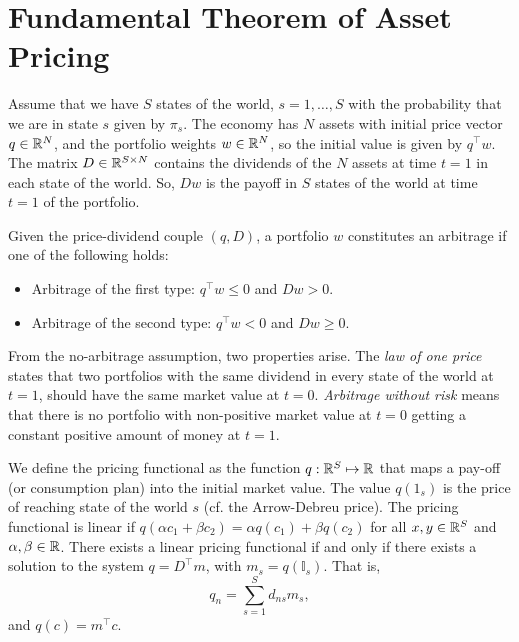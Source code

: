 \documentclass[twoside, titlepage]{article}
\begin{document}

\section{Fundamental Theorem of Asset Pricing}

Assume that we have $S$ states of the world, $s = 1, \dots, S$ with the probability that we are in state $s$ given by $\pi_s$. The economy has $N$ assets with initial price vector $q \in \mathbb{R}^N$, and the portfolio weights $w \in \mathbb{R}^N$, so the initial value is given by $q^\top w$. The matrix $D \in \mathbb{R}^{S \times N}$ contains the dividends of the $N$ assets at time $t=1$ in each state of the world. So, $Dw$ is the payoff in $S$ states of the world at time $t=1$ of the portfolio.

Given the price-dividend couple $(q, D)$, a portfolio $w$ constitutes an arbitrage if one of the following holds:
\begin{itemize}
    \item Arbitrage of the first type: $q^\top w \leq 0$ and $Dw > 0$.
    \begin{explanation}
    \end{explanation}
    \item Arbitrage of the second type: $q^\top w < 0$ and $Dw \geq 0$.
    \begin{explanation}
    \end{explanation}
\end{itemize}
From the no-arbitrage assumption, two properties arise. The \textit{law of one price} states that two portfolios with the same dividend in every state of the world at $t=1$, should have the same market value at $t=0$. \textit{Arbitrage without risk} means that there is no portfolio with non-positive market value at $t=0$ getting a constant positive amount of money at $t=1$.

We define the pricing functional as the function $q : \mathbb{R}^S \mapsto \mathbb{R}$ that maps a pay-off (or consumption plan) into the initial market value. The value $q(1_s)$ is the price of reaching state  of the world $s$ (cf. the Arrow-Debreu price). The pricing functional is linear if $q(\alpha c_1 + \beta c_2) = \alpha q(c_1) + \beta q(c_2)$ for all $x, y \in \mathbb{R}^S$ and $\alpha, \beta \in \mathbb{R}$. There exists a linear pricing functional if and only if there exists a solution to the system $q = D^\top m$, with $m_s = q(\mathbb{I}_s)$. That is,
\[
    q_n = \sum_{s=1}^{S}d_{ns}m_s,
\]
and $q(c) = m^\top c$.
\end{document}
